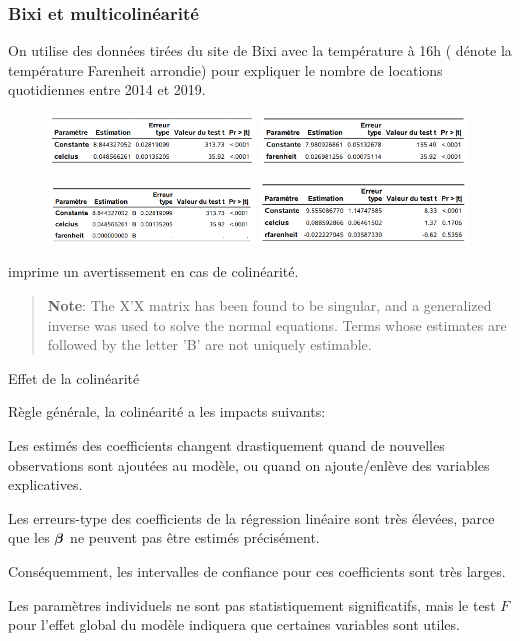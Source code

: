 \documentclass[xcolor={dvipsnames}]{beamer}
\begin{document}
\begin{frame}[fragile]
 \frametitle{Bixi et multicolinéarité}
 On utilise des données tirées du site de Bixi avec la température à 16h ( dénote la température Farenheit arrondie) pour expliquer le nombre de locations quotidiennes entre 2014 et 2019.
    \begin{figure}[ht!]
 \centering 
  \includegraphics[width = 0.49\textwidth]{img/c2/diapos3-e20} 
  \includegraphics[width = 0.49\textwidth]{img/c2/diapos3-e21}
 \end{figure}
 
   \begin{figure}[ht!]
 \centering 
  \includegraphics[width = 0.49\textwidth]{img/c2/diapos3-e22} 
  \includegraphics[width = 0.49\textwidth]{img/c2/diapos3-e23}
 \end{figure}
 {\footnotesize \SASlang imprime un avertissement en cas de colinéarité.
 \begin{quote}
 \textbf{Note}: The X'X matrix has been found to be singular, and a generalized inverse was used to solve the normal equations. Terms whose estimates are followed by the letter 'B' are not uniquely estimable.
 \end{quote}
 
 }


\end{frame}
\begin{frame}{Effet de la colinéarité}

Règle générale, la colinéarité a les impacts suivants:
\bi
\item Les estimés des coefficients changent drastiquement quand de nouvelles observations sont ajoutées au modèle, ou quand on ajoute/enlève des variables explicatives.
\item Les erreurs-type des coefficients de la régression linéaire sont très élevées, parce que les $\boldsymbol {\beta}$ ne peuvent pas être estimés précisément.
\item Conséquemment, les intervalles de confiance pour ces coefficients sont très larges.
\item Les paramètres individuels ne sont pas statistiquement significatifs, mais le test $F$ pour l'effet global du modèle indiquera que certaines variables sont utiles.
\ei

\end{frame}
\end{document}
